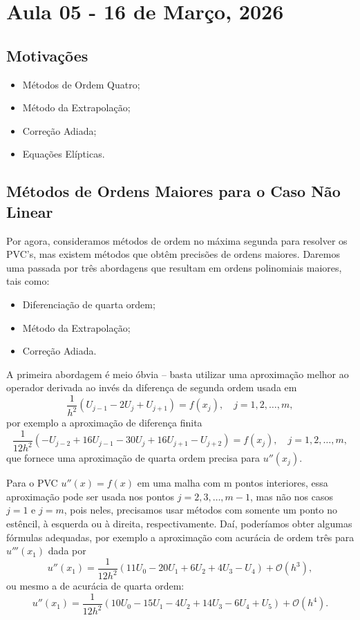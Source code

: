 \documentclass[../differential_methods.tex]{subfiles}
\begin{document}
\section{Aula 05 - 16 de Março, 2026}
\subsection{Motivações}
\begin{itemize}
	\item Métodos de Ordem Quatro;
	\item Método da Extrapolação;
	\item Correção Adiada;
	\item Equações Elípticas.
\end{itemize}
\subsection{Métodos de Ordens Maiores para o Caso Não Linear}
Por agora, consideramos métodos de ordem no máxima segunda para resolver os PVC's, mas existem métodos que obtêm precisões de ordens maiores. Daremos uma passada por três abordagens que resultam em ordens polinomiais maiores, tais como:
\begin{itemize}
	\item Diferenciação de quarta ordem;
	\item Método da Extrapolação;
	\item Correção Adiada.
\end{itemize}

A primeira abordagem é meio óbvia -- basta utilizar uma aproximação melhor ao operador derivada ao invés da diferença de segunda ordem usada em
\[
	\frac{1}{h^{2}}(U_{j-1}-2U_{j}+U_{j+1})=f(x_{j}),\quad j=1,2,\dotsc ,m,
\]
por exemplo a aproximação de diferença finita
\[
	\frac{1}{12h^{2}}(-U_{j-2}+16U_{j-1}-30U_{j}+16U_{j+1}-U_{j+2})=f(x_{j}),\quad j=1,2,\dotsc ,m,
\]
que fornece uma aproximação de quarta ordem precisa para \(u''(x_{j})\).

Para o PVC \(u''(x)=f(x)\) em uma malha com m pontos interiores, essa aproximação pode ser usada nos pontos \(j=2,3,\dotsc , m-1\), mas não nos casos \(j=1\) e \(j=m\), pois neles, precisamos usar métodos com somente um ponto no estêncil, à esquerda ou à direita, respectivamente. Daí, poderíamos obter algumas fórmulas adequadas, por exemplo a aproximação com acurácia de ordem três para \(u'''(x_1)\) dada por
\[
	u''(x_1)=\frac{1}{12h^{2}}(11U_{0}-20U_{1}+6U_{2}+4U_{3}-U_{4})+\mathcal{O}(h^{3}),
\]
ou mesmo a de acurácia de quarta ordem:
\[
	u''(x_1)=\frac{1}{12h^{2}}(10U_{0}-15U_{1}-4U_{2}+14U_{3}-6U_{4}+U_{5})+\mathcal{O}(h^{4}).
\]
\end{document}
